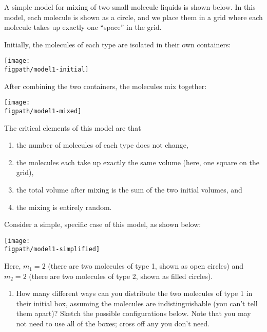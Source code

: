 \begin{activity}
\begin{instructornotes}
\end{instructornotes}


\begin{model}

A simple model for mixing of two small-molecule liquids is shown below.  In this model, each molecule is shown as a circle, and we place them in a grid where each molecule takes up exactly one ``space'' in the grid.

Initially, the molecules of each type are isolated in their own containers:

\centerline{\texttt{[image: \\figpath/model1-initial]}}

After combining the two containers, the molecules mix together:

\centerline{\texttt{[image: \\figpath/model1-mixed]}}

The critical elements of this model are that
\begin{enumerate}[itemsep=0pt,topsep=-6pt]
	\item the number of molecules of each type does not change,
	\item the molecules each take up exactly the same volume (here, one square on the grid),
	\item the total volume after mixing is the sum of the two initial volumes, and
	\item the mixing is entirely random.
\end{enumerate}

\end{model}

\vspace{0.05in}
\begin{ctqs}

	\question Consider a simple, specific case of this model, as shown below:

\centerline{\texttt{[image: \\figpath/model1-simplified]}}

		Here, $m_1=2$ (there are two molecules of type 1, shown as open circles) and $m_2=2$ (there are two molecules of type 2, shown as filled circles).
	
		\begin{enumerate}
			\item How many different ways can you distribute the two molecules of type 1 in their initial box, assuming the molecules are indistinguishable (you can't tell them apart)?  Sketch the possible configurations below.  Note that you may not need to use all of the boxes; cross off any you don't need.
			

\end{enumerate}
\end{ctqs}
\end{activity}
